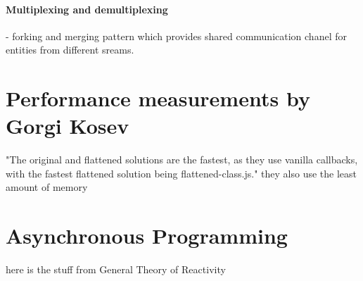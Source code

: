 \paragraph{Multiplexing and demultiplexing} - forking and merging pattern which provides shared communication chanel for entities from different sreams.\cite{nodejsbook}
\cite{nodejsbook}

\section{Performance measurements by Gorgi Kosev}
"The original and flattened solutions are the fastest, as they use vanilla callbacks, with the fastest flattened solution being flattened-class.js." they also use the least amount of memory\cite{asyncA}

\section{Asynchronous Programming}
here is the stuff from General Theory of Reactivity
